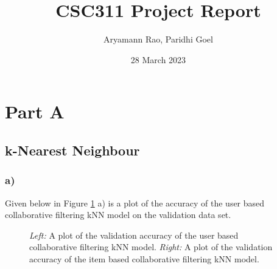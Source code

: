\documentclass{article}
\title{CSC311 Project Report}
\author{Aryamann Rao, Paridhi Goel}
\date{28 March 2023}
\begin{document}
\maketitle

\section*{Part A}
\subsection*{k-Nearest Neighbour}
\subsubsection*{a)}
Given below in Figure \ref{fig:knn} a) is a plot of the accuracy of the user based collaborative filtering kNN model on the validation data set.

\begin{figure}[H]
    \centering
    \qquad
    \caption{\textit{Left:} A plot of the validation accuracy of the user based collaborative filtering kNN model. \textit{Right:} A plot of the validation accuracy of the item based collaborative filtering kNN model.}
    \label{fig:knn}
\end{figure}
\end{document}
